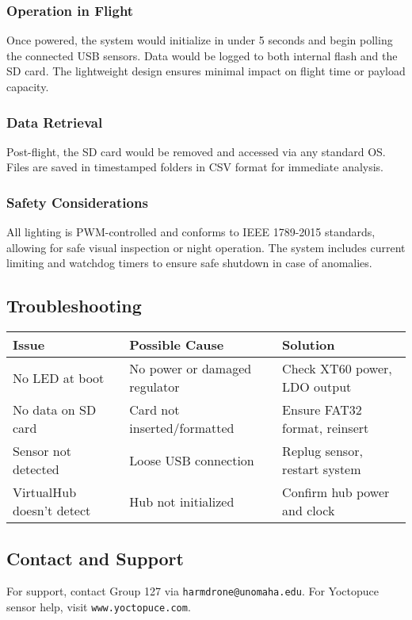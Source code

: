 \documentclass[../main.tex]{subfiles}
\begin{document}
\subsubsection{Operation in Flight}
Once powered, the system would initialize in under 5 seconds and begin polling the connected USB sensors. Data would be logged to both internal flash and the SD card. The lightweight design ensures minimal impact on flight time or payload capacity.

\subsubsection{Data Retrieval}
Post-flight, the SD card would be removed and accessed via any standard OS. Files are saved in timestamped folders in CSV format for immediate analysis.

\subsubsection{Safety Considerations}
All lighting is PWM-controlled and conforms to IEEE 1789-2015 standards, allowing for safe visual inspection or night operation. The system includes current limiting and watchdog timers to ensure safe shutdown in case of anomalies.

\subsection{Troubleshooting}
\begin{tabular}{|l|l|l|}
\hline
\textbf{Issue} & \textbf{Possible Cause} & \textbf{Solution} \\
\hline
No LED at boot & No power or damaged regulator & Check XT60 power, LDO output \\
\hline
No data on SD card & Card not inserted/formatted & Ensure FAT32 format, reinsert \\
\hline
Sensor not detected & Loose USB connection & Replug sensor, restart system \\
\hline
VirtualHub doesn't detect & Hub not initialized & Confirm hub power and clock \\
\hline
\end{tabular}

\subsection{Contact and Support}
For support, contact Group 127 via \texttt{harmdrone@unomaha.edu}. For Yoctopuce sensor help, visit \texttt{www.yoctopuce.com}.
\end{document}
